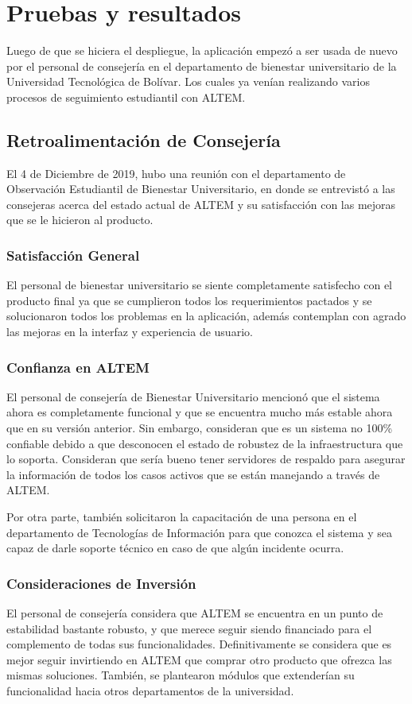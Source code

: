 \chapter{Pruebas y resultados}
Luego de que se hiciera el despliegue, la aplicación empezó a ser usada de nuevo por el personal de consejería en el departamento de bienestar universitario de la Universidad Tecnológica de Bolívar. Los cuales ya venían realizando varios procesos de seguimiento estudiantil con ALTEM. 

\section{Retroalimentación de Consejería}
El 4 de Diciembre de 2019, hubo una reunión con el departamento de Observación Estudiantil de Bienestar Universitario, en donde se entrevistó a las consejeras acerca del estado actual de ALTEM y su satisfacción con las mejoras que se le hicieron al producto.

\subsection{Satisfacción General}
El personal de bienestar universitario se siente completamente satisfecho con el producto final ya que se cumplieron todos los requerimientos pactados y se solucionaron todos los problemas en la aplicación, además contemplan con agrado las mejoras en la interfaz y experiencia de usuario. 

\subsection{Confianza en ALTEM}
El personal de consejería de Bienestar Universitario mencionó que el sistema ahora es completamente funcional y que se encuentra mucho más estable ahora que en su versión anterior. Sin embargo, consideran que es un sistema no 100\% confiable debido a que desconocen el estado de robustez de la infraestructura que lo soporta. Consideran que sería bueno tener servidores de respaldo para asegurar la información de todos los casos activos que se están manejando a través de ALTEM. 

Por otra parte, también solicitaron la capacitación de una persona en el departamento de Tecnologías de Información para que conozca el sistema y sea capaz de darle soporte técnico en caso de que algún incidente ocurra.

\subsection{Consideraciones de Inversión}
El personal de consejería considera que ALTEM se encuentra en un punto de estabilidad bastante robusto, y que merece seguir siendo financiado para el complemento de todas sus funcionalidades. Definitivamente se considera que es mejor seguir invirtiendo en ALTEM que comprar otro producto que ofrezca las mismas soluciones.
También, se plantearon módulos que extenderían su funcionalidad hacia otros departamentos de la universidad.

